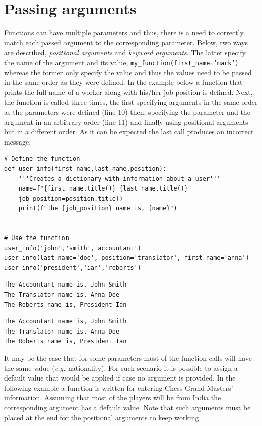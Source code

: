 \documentclass[10pt]{book}
\begin{document}
\section{Passing arguments}
\label{sec:org27dad87}
Functions can have multiple parameters and thus, there is a need to correctly match each passed argument to the corresponding parameter. Below, two ways are described, \emph{positional arguments} and \emph{keyword arguments}. The latter specify the name of the argument and its value, \texttt{my\_function(first\_name='mark')} whereas the former only specify the value and thus the values need to be passed in the same order as they were defined. In the example below a function that prints the full name of a worker along with his/her job position is defined. Next, the function is called three times, the first specifying arguments in the same order as the parameters were defined (line 10) then, specifying the parameter and the argument in an arbitrary order (line 11) and finally using positional arguments but in a different order. As it can be expected the last call produces an incorrect message.

\label{org2de7b22}
\begin{verbatim}
# Define the function
def user_info(first_name,last_name,position):
    '''Creates a dictionary with information about a user'''
    name=f"{first_name.title()} {last_name.title()}"
    job_position=position.title()
    print(f"The {job_position} name is, {name}")


# Use the function
user_info('john','smith','accountant')
user_info(last_name='doe', position='translator', first_name='anna')
user_info('president','ian','roberts')
\end{verbatim}

\label{org70f8b85}
\begin{verbatim}
The Accountant name is, John Smith
The Translator name is, Anna Doe
The Roberts name is, President Ian
\end{verbatim}

\label{org1598cc8}
\begin{verbatim}
The Accountant name is, John Smith
The Translator name is, Anna Doe
The Roberts name is, President Ian
\end{verbatim}

It may be the case that for some parameters most of the function calls will have the same value (\emph{e.g.} nationality). For such scenario it is possible to assign a default value that would be applied if case no argument is provided. In the following example a function is written for entering Chess Grand Masters' information. Assuming that most of the players will be from India the corresponding argument has a default value. Note that such arguments must be placed at the end for the positional arguments to keep working.
\end{document}

